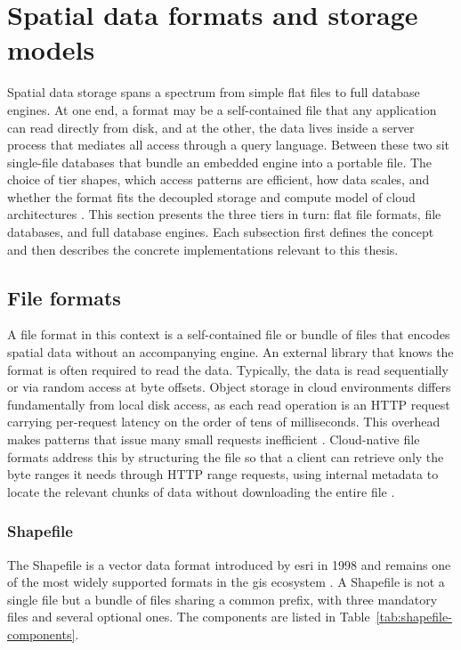 \section{Spatial data formats and storage models}
\label{sec:spatial-data-formats}

Spatial data storage spans a spectrum from simple flat files to full database engines. At one end, a format may be a self-contained file that any application can read directly from disk, and at the other, the data lives inside a server process that mediates all access through a query language. Between these two sit single-file databases that bundle an embedded engine into a portable file. The choice of tier shapes, which access patterns are efficient, how data scales, and whether the format fits the decoupled storage and compute model of cloud architectures \parencite{cngfoundation2024_cloud_optimized_geospatial_formats_guide}. This section presents the three tiers in turn: flat file formats, file databases, and full database engines. Each subsection first defines the concept and then describes the concrete implementations relevant to this thesis.

\subsection{File formats}
\label{sec:file-formats}
A file format in this context is a self-contained file or bundle of files that encodes spatial data without an accompanying engine. An external library that knows the format is often required to read the data. Typically, the data is read sequentially or via random access at byte offsets. Object storage in cloud environments differs fundamentally from local disk access, as each read operation is an HTTP request carrying per-request latency on the order of tens of milliseconds. This overhead makes patterns that issue many small requests inefficient \parencite{esri2024_cloud_imagery_storage}. Cloud-native file formats address this by structuring the file so that a client can retrieve only the byte ranges it needs through HTTP range requests, using internal metadata to locate the relevant chunks of data without downloading the entire file \parencite{ogc2023_cog_standard_21026}.

\subsubsection{Shapefile}
The Shapefile is a vector data format introduced by \acrfull{esri} in 1998 and remains one of the most widely supported formats in the \acrshort{gis} ecosystem \parencite{esri1998_shapefile_technical_description}. A Shapefile is not a single file but a bundle of files sharing a common prefix, with three mandatory files and several optional ones. The components are listed in Table~\ref{tab:shapefile-components}.

